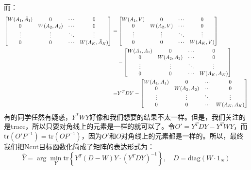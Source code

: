 \documentclass[a4paper]{article}
\begin{document}
而：
\begin{equation}
\begin{split}
    \begin{bmatrix}
    { W(A_1,\Bar{A}_1)} & 0 & \cdots & 0 \\
    0 &  W(A_2,\Bar{A}_2) &   \cdots & 0 \\
    \vdots & \vdots & \ddots & \vdots \\
    0 & 0  &   \cdots & { W(A_K,\Bar{A}_K)} \\
    \end{bmatrix} = & 
    \begin{bmatrix}
    { W(A_1,V)} & 0 & \cdots & 0 \\
    0 &  W(A_2,V) &   \cdots & 0 \\
    \vdots & \vdots & \ddots & \vdots \\
    0 & 0  &   \cdots & { W(A_K,V)} \\
    \end{bmatrix} \\
     & -
    \begin{bmatrix}
    { W(A_1,A_1)} & 0 & \cdots & 0 \\
    0 &  W(A_2,A_2) &   \cdots & 0 \\
    \vdots & \vdots & \ddots & \vdots \\
    0 & 0  &   \cdots & { W(A_K,A_K)} \\
    \end{bmatrix} \\
    = &  Y^TDY  - \begin{bmatrix}
    { W(A_1,A_1)} & 0 & \cdots & 0 \\
    0 &  W(A_2,A_2) &   \cdots & 0 \\
    \vdots & \vdots & \ddots & \vdots \\
    0 & 0  &   \cdots & { W(A_K,A_K)} \\
    \end{bmatrix} 
\end{split}
\end{equation}
有的同学任然有疑惑，$Y^TWY$好像和我们想要的结果不太一样。但是，我们关注的是trace，所以只要对角线上的元素是一样的就可以了。令$O' = Y^TDY - Y^TWY$，而$\mathrm{tr}(O'P^{-1})=\mathrm{tr}(OP^{-1})$，因为$O'$和$O$对角线上的元素都是一样的。所以，最终我们把Ncut目标函数化简成了矩阵的表达形式为：
\begin{equation}
    \hat{Y} = \arg\min_Y \mathrm{tr}\left\{ Y^T(D-W)Y\cdot (Y^TDY)^{-1} \right\},\quad D = \mathrm{diag}(W\cdot 1_N)
\end{equation}
\end{document}
